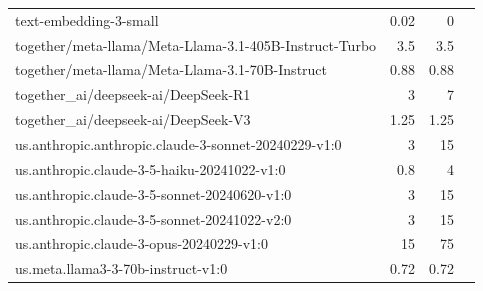 \begin{longtable}{lrrr}
text-embedding-3-small & 0.02 & 0 &  \\
together/meta-llama/Meta-Llama-3.1-405B-Instruct-Turbo & 3.5 & 3.5 &  \\
together/meta-llama/Meta-Llama-3.1-70B-Instruct & 0.88 & 0.88 &  \\
together\_ai/deepseek-ai/DeepSeek-R1 & 3 & 7 &  \\
together\_ai/deepseek-ai/DeepSeek-V3 & 1.25 & 1.25 &  \\
us.anthropic.anthropic.claude-3-sonnet-20240229-v1:0 & 3 & 15 &  \\
us.anthropic.claude-3-5-haiku-20241022-v1:0 & 0.8 & 4 &  \\
us.anthropic.claude-3-5-sonnet-20240620-v1:0 & 3 & 15 &  \\
us.anthropic.claude-3-5-sonnet-20241022-v2:0 & 3 & 15 &  \\
us.anthropic.claude-3-opus-20240229-v1:0 & 15 & 75 &  \\
us.meta.llama3-3-70b-instruct-v1:0 & 0.72 & 0.72 &  \\
\end{longtable}
